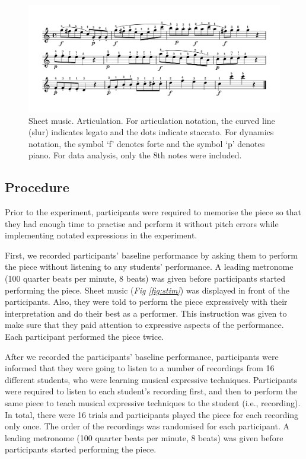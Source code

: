 \documentclass[
  man]{apa6}
\begin{document}
\begin{figure}
\includegraphics[width=1\linewidth]{manuscript_files/figure-latex/stimli-1} \caption{\label{fig:stim}Sheet music. Articulation. For articulation notation, the curved line (slur) indicates legato and the dots indicate staccato. For dynamics notation, the symbol `f' denotes forte and the symbol `p' denotes piano. For data analysis, only the 8th notes were included.}\label{fig:stimli}
\end{figure}

\hypertarget{procedure}{%
\subsection{Procedure}\label{procedure}}

Prior to the experiment, participants were required to memorise the piece so that they had enough time to practise and perform it without pitch errors while implementing notated expressions in the experiment.

First, we recorded participants' baseline performance by asking them to perform the piece without listening to any students' performance. A leading metronome (100 quarter beats per minute, 8 beats) was given before participants started performing the piece. Sheet music (\emph{Fig \ref{fig:stim}}) was displayed in front of the participants. Also, they were told to perform the piece expressively with their interpretation and do their best as a performer. This instruction was given to make sure that they paid attention to expressive aspects of the performance. Each participant performed the piece twice.

After we recorded the participants' baseline performance, participants were informed that they were going to listen to a number of recordings from 16 different students, who were learning musical expressive techniques. Participants were required to listen to each student's recording first, and then to perform the same piece to teach musical expressive techniques to the student (i.e., recording). In total, there were 16 trials and participants played the piece for each recording only once. The order of the recordings was randomised for each participant. A leading metronome (100 quarter beats per minute, 8 beats) was given before participants started performing the piece.
\end{document}
